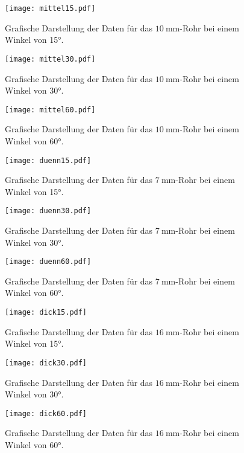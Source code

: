 \begin{figure}
  \centering
  \texttt{[image: mittel15.pdf]}
  \caption{Grafische Darstellung der Daten für das $\SI{10}{\milli\metre}$-Rohr bei einem Winkel von 15°.}
  \label{fig:mittel15}
\end{figure}
\begin{figure}
  \centering
  \texttt{[image: mittel30.pdf]}
  \caption{Grafische Darstellung der Daten für das $\SI{10}{\milli\metre}$-Rohr bei einem Winkel von 30°.}
  \label{fig:mittel30}
\end{figure}
\begin{figure}
  \centering
  \texttt{[image: mittel60.pdf]}
  \caption{Grafische Darstellung der Daten für das $\SI{10}{\milli\metre}$-Rohr bei einem Winkel von 60°.}
  \label{fig:mittel60}
\end{figure}
\begin{figure}
  \centering
  \texttt{[image: duenn15.pdf]}
  \caption{Grafische Darstellung der Daten für das $\SI{7}{\milli\metre}$-Rohr bei einem Winkel von 15°.}
  \label{fig:duenn15}
\end{figure}
\begin{figure}
  \centering
  \texttt{[image: duenn30.pdf]}
  \caption{Grafische Darstellung der Daten für das $\SI{7}{\milli\metre}$-Rohr bei einem Winkel von 30°.}
  \label{fig:duenn30}
\end{figure}
\begin{figure}
  \centering
  \texttt{[image: duenn60.pdf]}
  \caption{Grafische Darstellung der Daten für das $\SI{7}{\milli\metre}$-Rohr bei einem Winkel von 60°.}
  \label{fig:duenn60}
\end{figure}
\begin{figure}
  \centering
  \texttt{[image: dick15.pdf]}
  \caption{Grafische Darstellung der Daten für das $\SI{16}{\milli\metre}$-Rohr bei einem Winkel von 15°.}
  \label{fig:dick15}
\end{figure}
\begin{figure}
  \centering
  \texttt{[image: dick30.pdf]}
  \caption{Grafische Darstellung der Daten für das $\SI{16}{\milli\metre}$-Rohr bei einem Winkel von 30°.}
  \label{fig:dick30}
\end{figure}
\begin{figure}
  \centering
  \texttt{[image: dick60.pdf]}
  \caption{Grafische Darstellung der Daten für das $\SI{16}{\milli\metre}$-Rohr bei einem Winkel von 60°.}
  \label{fig:dick60}
\end{figure}
